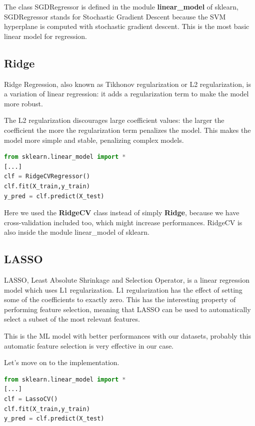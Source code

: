 The class SGDRegressor is defined in the module \textbf{linear\_model} of sklearn, SGDRegressor stands for Stochastic Gradient Descent because the SVM hyperplane is computed with stochastic gradient descent. This is the most basic linear model for regression.

\subsection{Ridge}
Ridge Regression, also known as Tikhonov regularization or L2 regularization, is a variation of linear regression: it adds a regularization term to make the model more robust.

The L2 regularization discourages large coefficient values: the larger the coefficient the more the regularization term penalizes the model. This makes the model more simple and stable, penalizing complex models.

\begin{lstlisting}[language=Python, caption=Ridge implementation]
from sklearn.linear_model import *
[...]
clf = RidgeCVRegressor()
clf.fit(X_train,y_train)
y_pred = clf.predict(X_test)
\end{lstlisting}

Here we used the \textbf{RidgeCV} class instead of simply \textbf{Ridge}, because we have cross-validation included too, which might increase performances. RidgeCV is also inside the module linear\_model of sklearn.

\subsection{LASSO}
LASSO, Least Absolute Shrinkage and Selection Operator, is a linear regression model which uses L1 regularization. L1 regularization has the effect of setting some of the coefficients to exactly zero. This has the interesting property of performing feature selection, meaning that LASSO can be used to automatically select a subset of the most relevant features.

This is the ML model with better performances with our datasets, probably this automatic feature selection is very effective in our case.

Let's move on to the implementation.

\begin{lstlisting}[language=Python, caption=LASSO implementation]
from sklearn.linear_model import *
[...]
clf = LassoCV()
clf.fit(X_train,y_train)
y_pred = clf.predict(X_test)
\end{lstlisting}

